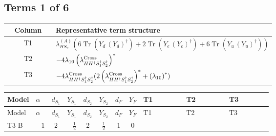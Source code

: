 \documentclass[8pt]{article}
\begin{document}
\begin{landscape}
\subsection*{Terms 1 of 6}
\begin{center}
\begin{tabular}{@{}c >{\raggedright\arraybackslash}p{0.82\linewidth}@{}}
\toprule
Column & Representative term structure \\
\midrule
T1 & \(\displaystyle {\lambda_{HS_2}^{(A)}} (6 \operatorname{Tr}\!\left({Y_d}\,\left({Y_d}\right)^{\dagger}\right)+2 \operatorname{Tr}\!\left({Y_e}\,\left({Y_e}\right)^{\dagger}\right)+6 \operatorname{Tr}\!\left({Y_u}\,\left({Y_u}\right)^{\dagger}\right))\) \\
\midrule
T2 & \(\displaystyle -4 {\lambda_{10}} \left({\lambda_{H H^\dagger S_1^\dagger S_2^\dagger}^{\rm Cross}}\right)^{*}\) \\
\midrule
T3 & \(\displaystyle -4 {\lambda_{H H^\dagger S_1^\dagger S_2^\dagger}^{\rm Cross}} (2 \left({\lambda_{H H^\dagger S_1^\dagger S_2^\dagger}^{\rm Cross}}\right)^{*}+\left({\lambda_{10}}\right)^{*})\) \\
\midrule
\bottomrule
\end{tabular}
\end{center}
\smallskip
\tiny
\begin{longtable}{@{}llcccccc >{\raggedright\arraybackslash}p{0.21\linewidth} >{\raggedright\arraybackslash}p{0.21\linewidth} >{\raggedright\arraybackslash}p{0.21\linewidth}@{}}
\toprule
Model & $\alpha$ & $d_{S_1}$ & $Y_{S_1}$ & $d_{S_2}$ & $Y_{S_2}$ & $d_F$ & $Y_F$ & T1 & T2 & T3 \\
\midrule
\endfirsthead
\toprule
Model & $\alpha$ & $d_{S_1}$ & $Y_{S_1}$ & $d_{S_2}$ & $Y_{S_2}$ & $d_F$ & $Y_F$ & T1 & T2 & T3 \\
\midrule
\endhead
T3-B & $-1$ & $2$ & $-\frac{1}{2}$ & $2$ & $\frac{1}{2}$ & $1$ & $0$ & \scriptsize\adjustbox{max width=\linewidth}{$\begin{gathered} {\lambda_{HS_2}^{(A)}} (6 \operatorname{Tr}\!\left({Y_d}\,\left({Y_d}\right)^{\dagger}\right)+2 \operatorname{Tr}\!\left({Y_e}\,\left({Y_e}\right)^{\dagger}\right)+6 \operatorname{Tr}\!\left({Y_u}\,\left({Y_u}\right)^{\dagger}\right))\end{gathered}$} & \scriptsize\adjustbox{max width=\linewidth}{$\begin{gathered} -4 {\lambda_{10}} \left({\lambda_{H H^\dagger S_1^\dagger S_2^\dagger}^{\rm Cross}}\right)^{*}\end{gathered}$} & \scriptsize\adjustbox{max width=\linewidth}{$\begin{gathered} -4 {\lambda_{H H^\dagger S_1^\dagger S_2^\dagger}^{\rm Cross}} (2 \left({\lambda_{H H^\dagger S_1^\dagger S_2^\dagger}^{\rm Cross}}\right)^{*}+\left({\lambda_{10}}\right)^{*})\end{gathered}$} \\

\end{longtable}
\end{landscape}
\end{document}
